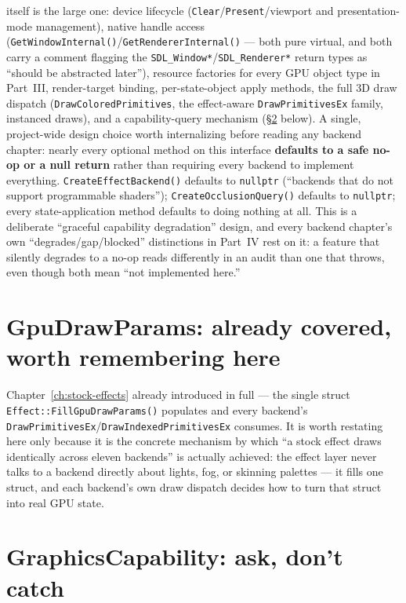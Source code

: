  itself is the large one: device lifecycle
(\texttt{Clear}/\texttt{Present}/viewport and presentation-mode management), native handle
access (\texttt{GetWindowInternal()}/\texttt{GetRendererInternal()} --- both pure virtual,
and both carry a comment flagging the \texttt{SDL\_Window*}/\texttt{SDL\_Renderer*} return
types as ``should be abstracted later''), resource factories for every GPU object type in
Part~III, render-target binding, per-state-object apply methods, the full 3D draw dispatch
(\texttt{DrawColoredPrimitives}, the effect-aware \texttt{DrawPrimitivesEx} family, instanced
draws), and a capability-query mechanism (\S\ref{sec:graphicscapability} below). A single,
project-wide design choice worth internalizing before reading any backend chapter: nearly
every optional method on this interface \textbf{defaults to a safe no-op or a null return}
rather than requiring every backend to implement everything. \texttt{CreateEffectBackend()}
defaults to \texttt{nullptr} (``backends that do not support programmable shaders'');
\texttt{CreateOcclusionQuery()} defaults to \texttt{nullptr}; every state-application method
defaults to doing nothing at all. This is a deliberate ``graceful capability degradation''
design, and every backend chapter's own ``degrades/gap/blocked'' distinctions in Part~IV rest on it: a feature
that silently degrades to a no-op reads differently in an audit than one that throws, even
though both mean ``not implemented here.''

\section{GpuDrawParams: already covered, worth remembering here}

Chapter~\ref{ch:stock-effects} already introduced  in full --- the
single struct \texttt{Effect::FillGpuDrawParams()} populates and every backend's
\texttt{DrawPrimitivesEx}/\texttt{DrawIndexedPrimitivesEx} consumes. It is worth restating
here only because it is the concrete mechanism by which ``a stock effect draws identically
across eleven backends'' is actually achieved: the effect layer never talks to a backend
directly about lights, fog, or skinning palettes --- it fills one struct, and each backend's
own draw dispatch decides how to turn that struct into real GPU state.

\section{GraphicsCapability: ask, don't catch}
\label{sec:graphicscapability}

